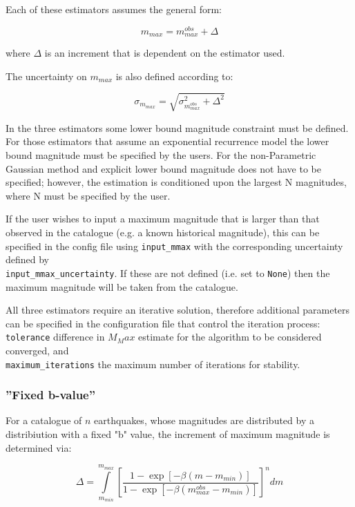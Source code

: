 Each of these estimators assumes the general form:

\begin{equation}
m_{max} = m_{max}^{obs} + \Delta
\end{equation}

where $\Delta$ is an increment that is dependent on the estimator used.

The uncertainty on $m_{max}$ is also defined according to:

\begin{equation}
    \sigma_{m_{max}} = \sqrt{\sigma_{m_{max}^{obs}}^2 + \Delta^{2}}
\end{equation}

In the three estimators some lower bound magnitude constraint must be defined. For those estimators that assume an exponential recurrence model the lower bound magnitude must be specified by the users. For the non-Parametric Gaussian method and explicit lower bound magnitude does not have to be specified; however, the estimation is conditioned upon the largest N magnitudes, where N must be specified by the user.

If the user wishes to input a maximum magnitude that is larger than that observed in the catalogue (e.g. a known historical magnitude), this can be specified in the config file using \verb=input_mmax= with the corresponding uncertainty defined by \\ \verb=input_mmax_uncertainty=. If these are not defined (i.e. set to \verb=None=) then the maximum magnitude will be taken from the catalogue.

All three estimators require an iterative solution, therefore additional parameters can be specified in the configuration file that control the iteration process: \verb=tolerance= difference in $M_Max$ estimate for the algorithm to be considered converged, and \\ \verb=maximum_iterations= the maximum number of iterations for stability. 


\subsubsection{''Fixed b-value''}

For a catalogue of $n$ earthquakes, whose magnitudes are distributed by a \cite{GutenbergRichter1944} distribiution with a fixed "b" value, the increment of maximum magnitude is determined via:

\begin{equation}
\Delta = \int\limits_{m_{min}} ^{m_{max}} \left[ {\frac{1 - \exp \left[ {-\beta \left( {m - m_{min}} \right)} \right]}{1 - \exp \left[ {-\beta \left( {m_{max}^{obs} - m_{min}} \right) } \right]}} \right] ^n dm
\end{equation}


